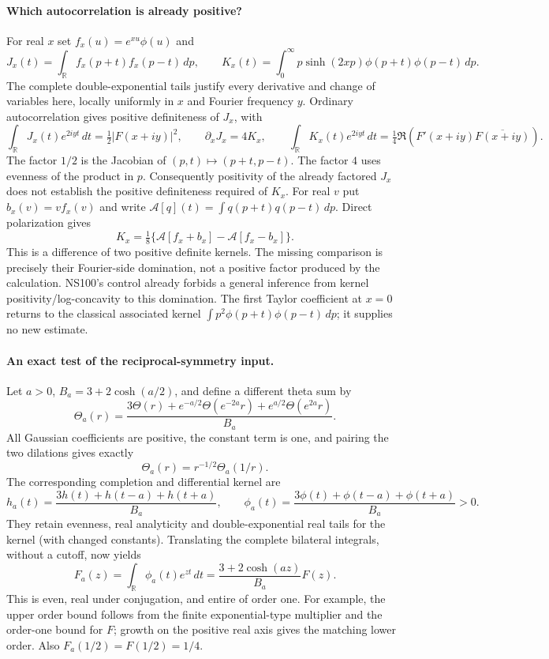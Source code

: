 \paragraph{Which autocorrelation is already positive?}
For real $x$ set $f_x(u)=e^{xu}\phi(u)$ and
\[
 J_x(t)=\int_{\mathbb R}f_x(p+t)f_x(p-t)\,dp,
 \qquad
 K_x(t)=\int_0^\infty p\sinh(2xp)\phi(p+t)\phi(p-t)\,dp.
\]
The complete double-exponential tails justify every derivative and change
of variables here, locally uniformly in $x$ and Fourier frequency $y$.
Ordinary autocorrelation gives positive definiteness of $J_x$, with
\[
 \int_{\mathbb R}J_x(t)e^{2iyt}\,dt=\tfrac12|F(x+iy)|^2,
 \qquad \partial_xJ_x=4K_x,
 \qquad
 \int_{\mathbb R}K_x(t)e^{2iyt}\,dt
       =\tfrac14\Re(F'(x+iy)\overline{F(x+iy)}).             \tag{3}
\]
The factor $1/2$ is the Jacobian of $(p,t)\mapsto(p+t,p-t)$.
The factor $4$ uses evenness of the product in $p$.
Consequently positivity of the already factored $J_x$ does not establish
the positive definiteness required of $K_x$. For real $v$ put
$b_x(v)=v f_x(v)$ and write
$\mathcal A[q](t)=\int q(p+t)q(p-t)\,dp$. Direct polarization gives
\[
 K_x=\tfrac18\{\mathcal A[f_x+b_x]-\mathcal A[f_x-b_x]\}.   \tag{4}
\]
This is a difference of two positive definite kernels. The missing
comparison is precisely their Fourier-side domination, not a positive
factor produced by the calculation. NS100's control already forbids a
general inference from kernel positivity/log-concavity to this domination.
The first Taylor coefficient at $x=0$ returns to the classical associated
kernel $\int p^2\phi(p+t)\phi(p-t)\,dp$; it supplies no new estimate.

\paragraph{An exact test of the reciprocal-symmetry input.}
Let $a>0$, $B_a=3+2\cosh(a/2)$, and define a different theta sum by
\[
 \Theta_a(r)=\frac{3\Theta(r)+e^{-a/2}\Theta(e^{-2a}r)
                         +e^{a/2}\Theta(e^{2a}r)}{B_a}.     \tag{5}
\]
All Gaussian coefficients are positive, the constant term is one, and
pairing the two dilations gives exactly
\[
 \Theta_a(r)=r^{-1/2}\Theta_a(1/r).
\]
The corresponding completion and differential kernel are
\[
 h_a(t)=\frac{3h(t)+h(t-a)+h(t+a)}{B_a},\qquad
 \phi_a(t)=\frac{3\phi(t)+\phi(t-a)+\phi(t+a)}{B_a}>0.     \tag{6}
\]
They retain evenness, real analyticity and double-exponential real tails
for the kernel (with changed constants). Translating the complete
bilateral integrals, without a cutoff, now yields
\[
 F_a(z)=\int_{\mathbb R}\phi_a(t)e^{zt}\,dt
       =\frac{3+2\cosh(az)}{B_a}F(z).                      \tag{7}
\]
This is even, real under conjugation, and entire of order one. For example,
the upper order bound follows from the finite exponential-type multiplier
and the order-one bound for $F$; growth on the positive real axis gives
the matching lower order. Also $F_a(1/2)=F(1/2)=1/4$.

